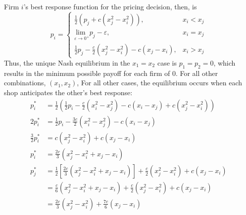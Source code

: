 \documentclass{article}
\begin{document}
Firm $i$'s best response function for the pricing decision, then, is 
\[
	p_i = 	\begin{cases}
				\frac{1}{2}\left(p_j + c(x_j^2 - x_i^2)\right), 					& x_i<x_j	\\
				\underset{\varepsilon\rightarrow0^+}{\text{lim }}p_j - \varepsilon,	& x_i=x_j 	\\
				\frac{1}{2}p_j - \frac{c}{2}(x_j^2 - x_i^2)-c\left(x_j-x_i\right), 	& x_i>x_j
			\end{cases}
\]
Thus, the unique Nash equilibrium in the $x_1=x_2$ case is ${p_1=p_2=0}$, which results in the minimum possible payoff for each firm of 0. For all other combinations, $(x_1,x_2)$, For all other cases, the equilibrium occurs when each shop anticipates the other's best response:
\begin{align*}
	p_i^*				&= \frac{1}{2}\left(\frac{1}{2}p_i - \frac{c}{2}(x_i^2 - x_j^2)-c\left(x_i-x_j\right) + c(x_j^2 - x_i^2)\right)	\\
	2p_i^*				&= \frac{1}{2}p_i - \frac{3c}{2}(x_i^2 - x_j^2)-c\left(x_i-x_j\right)											\\
	\frac{3}{2}p^*_i	&= c(x_j^2 - x_i^2) + c\left(x_j-x_i\right)																		\\
	p_i^* 				&= \frac{2c}{3}\left(x_j^2 - x_i^2+x_j-x_i\right)																\\
	p_j^*				&= \frac{1}{2}\left[\frac{2c}{3}\left(x_j^2 - x_i^2+x_j-x_i\right)\right] + \frac{c}{2}(x_j^2 - x_i^2)+c\left(x_j-x_i\right)	\\
						&= \frac{c}{6}\left(x_j^2 - x_i^2+x_j-x_i\right) + \frac{c}{2}(x_j^2 - x_i^2)+c\left(x_j-x_i\right)				\\
						&= \frac{2c}{3}\left(x_j^2 - x_i^2\right) + \frac{7c}{6}\left(x_j-x_i\right)
\end{align*} 
\end{document}
